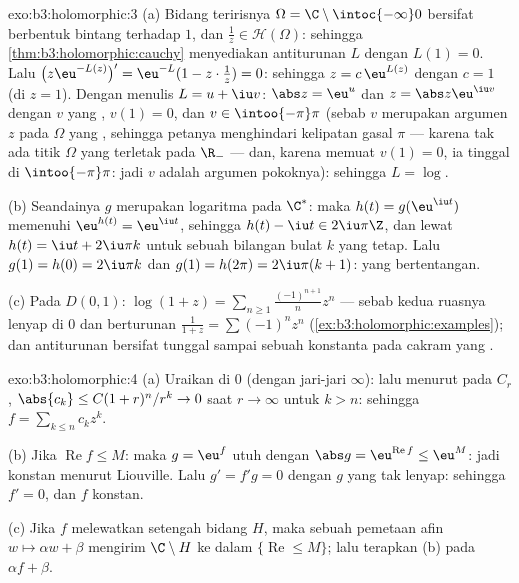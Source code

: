 \begin{solution}{exo:b3:holomorphic:3}
(a) Bidang teririsnya $\Omega = \C\setminus\intoc{-\infty}0$ bersifat
berbentuk bintang terhadap $1$, dan $\frac1z \in \mathcal H(\Omega)$:
sehingga \cref{thm:b3:holomorphic:cauchy} menyediakan antiturunan $L$
dengan $L(1) = 0$. Lalu $\bigl(z\eu^{-L(z)}\bigr)' =
\eu^{-L}(1 - z\cdot\frac1z) = 0$: sehingga $z = c\,\eu^{L(z)}$ dengan $c
= 1$ (di $z = 1$). Dengan menulis $L = u + \iu v$: $\abs z = \eu^u$
dan $z = \abs z\eu^{\iu v}$ dengan $v$ yang , $v(1) = 0$, dan
$v \in \intoo{-\pi}\pi$ (sebab $v$ merupakan argumen  $z$
pada $\Omega$ yang , sehingga petanya menghindari kelipatan
gasal $\pi$ --- karena tak ada titik $\Omega$ yang terletak pada $\R_-$
--- dan, karena memuat $v(1) = 0$, ia tinggal di $\intoo{-\pi}\pi$:
jadi $v$ adalah argumen pokoknya): sehingga $L = \log$.

(b) Seandainya $g$ merupakan logaritma  pada $\C^*$: maka $h(t) =
g(\eu^{\iu t})$ memenuhi $\eu^{h(t)} = \eu^{\iu t}$, sehingga $h(t)
- \iu t \in 2\iu\pi\Z$, dan lewat  $h(t) = \iu t +
2\iu\pi k$ untuk sebuah bilangan bulat $k$ yang tetap. Lalu $g(1) = h(0) =
2\iu\pi k$ dan $g(1) = h(2\pi) = 2\iu\pi(k + 1)$: yang
bertentangan.

(c) Pada $D(0,1)$: $\log(1 + z) =
\sum_{n\geq1}\frac{(-1)^{n+1}}{n}z^n$ --- sebab kedua ruasnya lenyap di
$0$ dan berturunan $\frac1{1+z} = \sum(-1)^nz^n$
(\cref{ex:b3:holomorphic:examples}); dan antiturunan bersifat tunggal sampai
sebuah konstanta pada cakram yang .
\end{solution}

\begin{solution}{exo:b3:holomorphic:4}
(a) Uraikan di $0$ (dengan jari-jari $\infty$): lalu menurut 
pada $C_r$, $\abs{c_k} \leq C(1 + r)^n/r^k \to 0$ saat $r \to
\infty$ untuk $k > n$: sehingga $f = \sum_{k\leq n}c_kz^k$.

(b) Jika $\operatorname{Re}f \leq M$: maka $g = \eu^f$ utuh dengan
$\abs g = \eu^{\operatorname{Re}f} \leq \eu^M$: jadi konstan menurut
Liouville. Lalu $g' = f'g = 0$ dengan $g$ yang tak lenyap: sehingga $f' =
0$, dan $f$ konstan.

(c) Jika $f$ melewatkan setengah bidang $H$, maka sebuah pemetaan afin $w \mapsto
\alpha w + \beta$ mengirim $\C\setminus H$ ke dalam
$\{\operatorname{Re} \leq M\}$; lalu terapkan (b) pada $\alpha f +
\beta$.
\end{solution}

